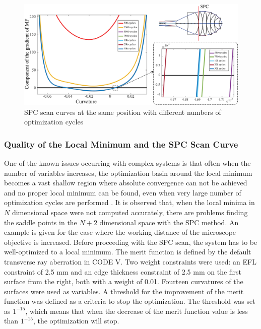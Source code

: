 \begin{figure}[h!]
    \centering
    \includegraphics[width=\textwidth]{chapter-4/figures/vollrath_optcyc.png}
    \caption{SPC scan curves at the same position with different numbers of optimization cycles}
    \label{fig: vollrath_optcyc}
\end{figure}

\subsubsection{Quality of the Local Minimum and the SPC Scan Curve}
One of the known issues occurring with complex systems is that often when the number of variables increases, the optimization basin around the local minimum becomes a vast shallow region where absolute convergence can not be achieved and no proper local minimum can be found, even when very large number of optimization cycles are performed \cite{Brixner81}. It is observed that, when the local minima in $N$ dimensional space were not computed accurately, there are problems finding the saddle points in the $N+2$ dimensional space with the SPC method. An example is given for the case where the working distance of the microscope objective is increased. Before proceeding with the SPC scan, the system has to be well-optimized to a local minimum. The merit function is defined by the default transverse ray aberration in CODE V. Two weight constraints were used: an EFL constraint of 2.5 mm and an edge thickness constraint of 2.5 mm on the first surface from the right, both with a weight of 0.01. Fourteen curvatures of the surfaces were used as variables. A threshold for the improvement of the merit function was defined as a criteria to stop the optimization. The threshold was set as $1^{-15}$, which means that when the decrease of the merit function value is less than $1^{-15}$, the optimization will stop. 
 
